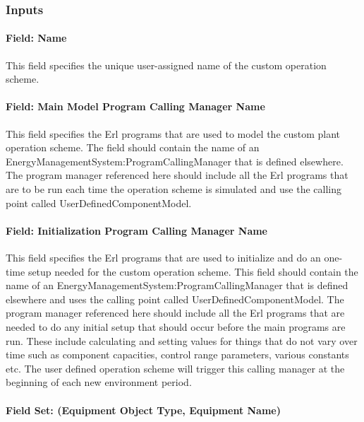 \subsubsection{Inputs}\label{inputs-1-047}

\paragraph{Field: Name}\label{field-name-4-032}

This field specifies the unique user-assigned name of the custom operation scheme.

\paragraph{Field: Main Model Program Calling Manager Name}\label{field-main-model-program-calling-manager-name-1}

This field specifies the Erl programs that are used to model the custom plant operation scheme. The field should contain the name of an EnergyManagementSystem:ProgramCallingManager that is defined elsewhere. The program manager referenced here should include all the Erl programs that are to be run each time the operation scheme is simulated and use the calling point called UserDefinedComponentModel.

\paragraph{Field: Initialization Program Calling Manager Name}\label{field-initialization-program-calling-manager-name}

This field specifies the Erl programs that are used to initialize and do an one-time setup needed for the custom operation scheme. This field should contain the name of an EnergyManagementSystem:ProgramCallingManager that is defined elsewhere and uses the calling point called UserDefinedComponentModel. The program manager referenced here should include all the Erl programs that are needed to do any initial setup that should occur before the main programs are run. These include calculating and setting values for things that do not vary over time such as component capacities, control range parameters, various constants etc. The user defined operation scheme will trigger this calling manager at the beginning of each new environment period.

\paragraph{Field Set: (Equipment Object Type, Equipment Name)}\label{field-set-equipment-object-type-equipment-name}

